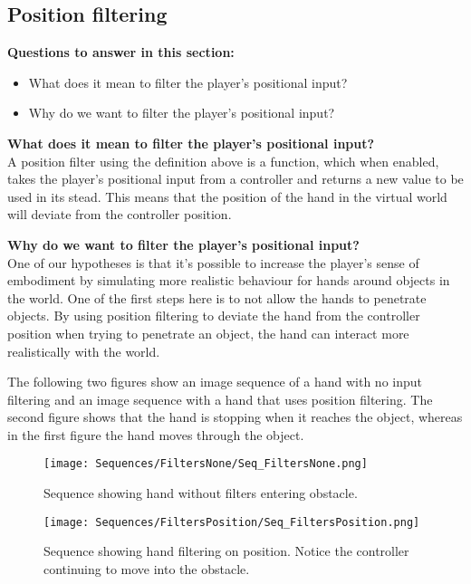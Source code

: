 \subsection{Position filtering}
\label{subsec:categoryPositionFiltering}
\textbf{Questions to answer in this section:}
\begin{itemize}
\item What does it mean to filter the player's positional input?
\item Why do we want to filter the player's positional input?
\end{itemize}

\textbf{What does it mean to filter the player's positional input?}\\
A position filter using the definition above is a function, which when enabled, takes the player's positional input from a controller and returns a new value to be used in its stead. This means that the position of the hand in the virtual world will deviate from the controller position.

\textbf{Why do we want to filter the player's positional input?}\\
One of our hypotheses is that it's possible to increase the player's sense of embodiment by simulating more realistic behaviour for hands around objects in the world. One of the first steps here is to not allow the hands to penetrate objects. By using position filtering to deviate the hand from the controller position when trying to penetrate an object, the hand can interact more realistically with the world.

The following two figures show an image sequence of a hand with no input filtering and an image sequence with a hand that uses position filtering. The second figure shows that the hand is stopping when it reaches the object, whereas in the first figure the hand moves through the object.

\begin{figure}[H]
\label{fig:filtersNone}
\centering
\texttt{[image: Sequences/FiltersNone/Seq\_FiltersNone.png]}
\caption{Sequence showing hand without filters entering obstacle.}
\end{figure}

\begin{figure}[H]
\label{fig:filtersPosition}
\centering
\texttt{[image: Sequences/FiltersPosition/Seq\_FiltersPosition.png]}
\caption{Sequence showing hand filtering on position. Notice the controller continuing to move into the obstacle.}
\end{figure}

